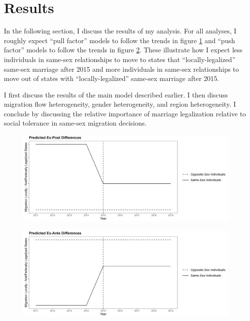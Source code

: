 \documentclass[12pt,letterpaper]{article}
\begin{document}


\clearpage
\section{Results}
In the following section, I discuss the results of my analysis. For all analyses, I roughly expect “pull factor” models to follow the trends in figure \ref{fig: ex_post_diffs} and “push factor” models to follow the trends in figure \ref{fig: ex_ante_diffs}. These illustrate how I expect less individuals in same-sex relationships to move to states that “locally-legalized” same-sex marriage after 2015 and more individuals in same-sex relationships to move out of states with “locally-legalized” same-sex marriage after 2015. 

I first discuss the results of the main model described earlier. I then discuss migration flow heterogeneity, gender heterogeneity, and region heterogeneity. I conclude by discussing the relative importance of marriage legalization relative to social tolerance in same-sex migration decisions.

\begin{figure}[h]
    \label{fig: ex_post_diffs}
    \includegraphics[width=0.75\linewidth]{outputs/summary_stats/ex_post_diffs.png}
    \centering
    \caption{}
\end{figure}

\begin{figure}[h]
    \centering
    \includegraphics[width=0.75\linewidth]{outputs/summary_stats/ex_ante_diffs.png}
    \caption{}
    \label{fig: ex_ante_diffs}
\end{figure}
\end{document}
